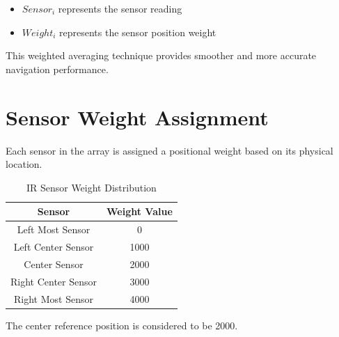 \documentclass[12pt,a4paper,oneside]{report}
\begin{document}
\begin{itemize}

\item \(Sensor_i\) represents the sensor reading

\item \(Weight_i\) represents the sensor position weight

\end{itemize}

This weighted averaging technique provides smoother and more accurate navigation performance.


\section{Sensor Weight Assignment}

Each sensor in the array is assigned a positional weight based on its physical location.


\begin{table}[H]
\centering
\caption{IR Sensor Weight Distribution}

\begin{tabular}{|c|c|}
\hline

\textbf{Sensor} &
\textbf{Weight Value} \\

\hline

Left Most Sensor & 0 \\

Left Center Sensor & 1000 \\

Center Sensor & 2000 \\

Right Center Sensor & 3000 \\

Right Most Sensor & 4000 \\

\hline

\end{tabular}

\end{table}

The center reference position is considered to be 2000.
\end{document}
